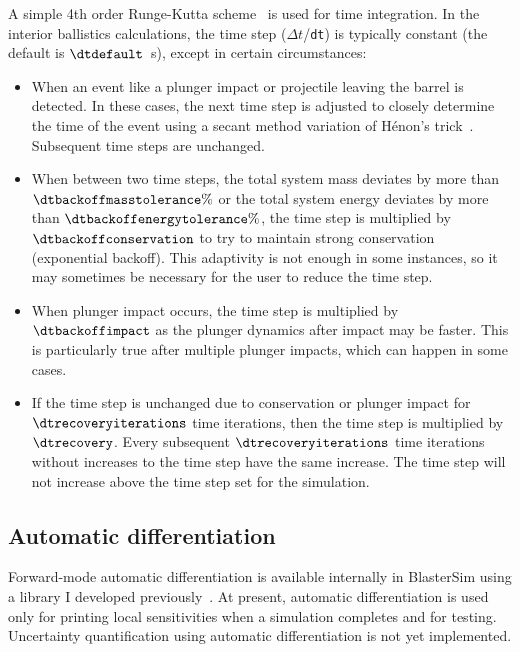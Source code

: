 A simple 4th order Runge-Kutta scheme~\cite[p.~1081]{kreyszig_advanced_1993} is used for time integration.
In the interior ballistics calculations, the time step ($\Delta t$/\texttt{dt}) is typically constant (the default is $\dtdefault$~s), except in certain circumstances:
\begin{itemize}
\item When an event like a plunger impact or projectile leaving the barrel is detected.
In these cases, the next time step is adjusted to closely determine the time of the event using a secant method variation of H\'{e}non's trick~\cite{henon_numerical_1982}.
Subsequent time steps are unchanged.
\item When between two time steps, the total system mass deviates by more than $\dtbackoffmasstolerance\%$ or the total system energy deviates by more than $\dtbackoffenergytolerance\%$, the time step is multiplied by $\dtbackoffconservation$ to try to maintain strong conservation (exponential backoff).
This adaptivity is not enough in some instances, so it may sometimes be necessary for the user to reduce the time step.
\item When plunger impact occurs, the time step is multiplied by $\dtbackoffimpact$ as the plunger dynamics after impact may be faster.
This is particularly true after multiple plunger impacts, which can happen in some cases.
\item If the time step is unchanged due to conservation or plunger impact for $\dtrecoveryiterations$ time iterations, then the time step is multiplied by $\dtrecovery$.
Every subsequent $\dtrecoveryiterations$ time iterations without increases to the time step have the same increase.
The time step will not increase above the time step set for the simulation.
\end{itemize}


\subsection{Automatic differentiation}\label{autodiff}

Forward-mode automatic differentiation is available internally in BlasterSim using a library I developed previously~\cite{trettel_btrettelflt_2026}.
At present, automatic differentiation is used only for printing local sensitivities when a simulation completes and for testing.
Uncertainty quantification using automatic differentiation is not yet implemented.

